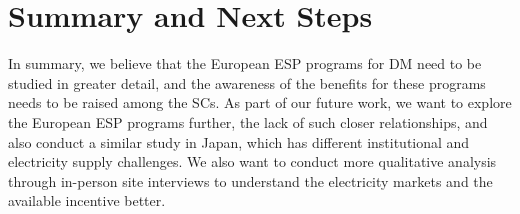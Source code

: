 \section{Summary and Next Steps}
\label{summary}


In summary, we believe that the European ESP programs for DM need to be studied in greater detail, and the awareness of the benefits for these programs needs to be raised among the SCs. As part of our future work, we want to explore the European ESP programs further, the lack of such closer relationships, and also conduct a similar study in Japan, which has different institutional and electricity supply challenges. We also want to conduct more qualitative analysis through in-person site interviews to understand the electricity markets and the available incentive better. 
